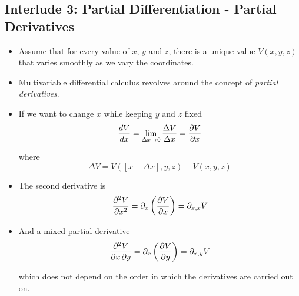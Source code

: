 \documentclass[../main.tex]{subfiles}
\begin{document}
\subsection{Interlude 3: Partial Differentiation - Partial Derivatives}
\begin{itemize}
    \item Assume that for every value of $x$, $y$ and $z$, there is a unique
        value $V(x,y,z)$ that varies smoothly as we vary the coordinates.

    \item Multivariable differential calculus revolves around the concept of
        \textit{partial derivatives}.

    \item If we want to change $x$ while keeping $y$ and $z$ fixed
        \begin{equation}
            \frac{dV}{dx} = \lim_{\Delta x \rightarrow 0} \frac{\Delta V}{\Delta x} = \pdv{V}{x}
        \end{equation}

        where
        \begin{equation}
            \Delta V = V (\left[x + \Delta x\right], y, z) - V(x, y, z)
        \end{equation}

    \item The second derivative is 
        \begin{equation}
            \pdv[order=2]{V}{x} = \partial_x \left(\pdv{V}{x}\right) = \partial_{x,x}V
        \end{equation}

    \item And a mixed partial derivative
        \begin{equation}
            \pdv{V}{x,y} = \partial_x \left(\pdv{V}{y}\right) = \partial_{x,y}V
        \end{equation}

        which does not depend on the order in which the derivatives are carried
        out on.

\end{itemize}
\end{document}
